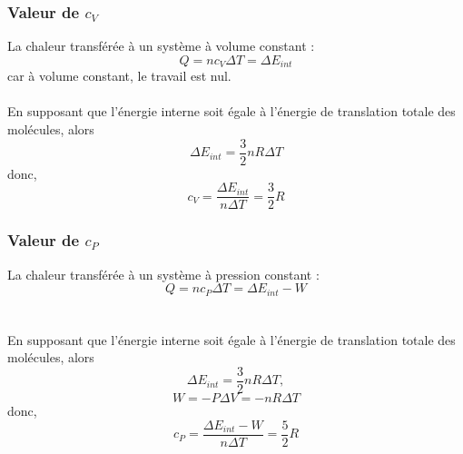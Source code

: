\documentclass{article}
\begin{document}
        \subsubsection{Valeur de $c_V$}
            La chaleur transférée à un système à volume constant :
            $$
            Q = n c_V \Delta T = \Delta E_{int}
            $$
            car à volume constant, le travail est nul. \\\\
            En supposant que l’énergie interne soit égale à l’énergie de translation totale des molécules, alors
            $$
            \Delta E_{int} = \frac{3}{2} n R \Delta T 
            $$
            donc,
            $$
            c_V = \frac{\Delta E_{int}}{n \Delta T} = \frac{3}{2} R
            $$
        
        \subsubsection{Valeur de $c_P$}
            La chaleur transférée à un système à pression constant :
            $$
            Q = n c_P \Delta T = \Delta E_{int} - W
            $$\\\\
            En supposant que l’énergie interne soit égale à l’énergie de translation totale des molécules, alors
            $$
            \Delta E_{int} = \frac{3}{2} n R \Delta T,
            $$
            $$
            W = -P \Delta V = -n R \Delta T
            $$
            donc,
            $$
            c_P = \frac{\Delta E_{int} - W}{n \Delta T} = \frac{5}{2} R
            $$
\end{document}
